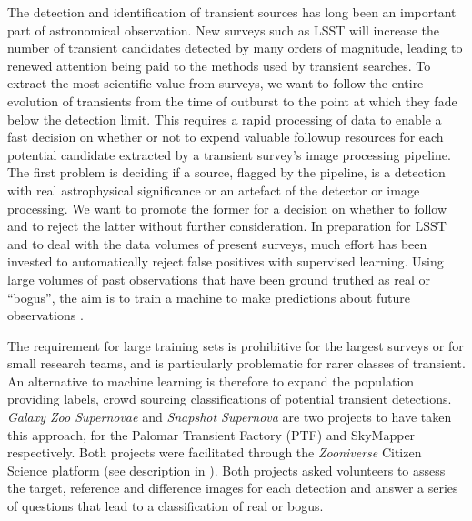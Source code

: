 \documentclass[a4paper,fleqn,usenatbib]{mnras}
\begin{document}
The detection and identification of transient sources has long been an important part of astronomical observation. New surveys such as LSST \citep{Ivezic08} will increase the number of transient candidates detected by many orders of magnitude, leading to renewed attention being paid to the methods used by transient searches.  To extract the most scientific value from surveys, we want to follow the entire evolution of transients from the time of outburst to the point at which they fade below the detection limit.  This requires a rapid processing of data to enable a fast decision on whether or not to expend valuable followup resources for each potential candidate extracted by a transient survey's image processing pipeline.  The first problem is deciding if a source, flagged by the pipeline, is a detection with real astrophysical significance or an artefact of the detector or image processing.  We want to promote the former for a decision on whether to follow and to reject the latter without further consideration.  In preparation for LSST and to deal with the data volumes of present surveys, much effort has been invested to automatically reject false positives with supervised learning. Using large volumes of past observations that have been ground truthed as real or ``bogus'', the aim is to train a machine to make predictions about future observations \citep{Bloom12, Brink13, Goldstein15, duBuisson15, Donalek08, Romano06, Bailey07}.


The requirement for large training sets is prohibitive for the largest surveys or for small research teams, and is particularly problematic for rarer classes of transient.  An alternative to machine learning is therefore to expand the population providing labels, crowd sourcing classifications of potential transient detections.  \textit{Galaxy Zoo Supernovae} \citep{Smith11} and \textit{Snapshot Supernova} \citep{Campbell15} are two projects to have taken this approach, for the Palomar Transient Factory (PTF) \citep{Rau09, Law09} and SkyMapper respectively.  Both projects were facilitated through the \textit{Zooniverse} Citizen Science platform (see description in \citet{Marshall15}).  Both projects asked volunteers to assess the target, reference and difference images for each detection and answer a series of questions that lead to a classification of real or bogus.  
\end{document}
